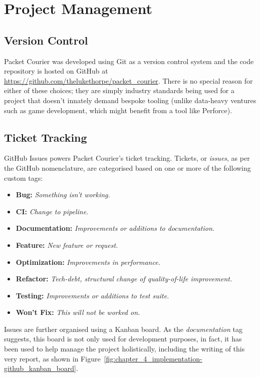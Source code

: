 \section{Project Management}\label{section:project_management}

\subsection{Version Control}\label{subsection:version_control}

Packet Courier was developed using Git\cite{git} as a version control system and the code repository is hosted on
GitHub\cite{github, packet_courier} at \url{https://github.com/thelukethorpe/packet_courier}. There is no special
reason for either of these choices; they are simply industry standards being used for a project that doesn't
innately demand bespoke tooling (unlike data-heavy ventures such as game development, which might benefit from a tool
like Perforce\cite{perforce, perforce_vs_git}).

\subsection{Ticket Tracking}\label{subsection:ticket_tracking}

GitHub Issues\cite{github_issues} powers Packet Courier's ticket tracking. Tickets, or \emph{issues}, as per the
GitHub nomenclature, are categorised based on one or more of the following custom tags:
\begin{itemize}
    \item \textbf{Bug:} \emph{Something isn't working.}
    \item \textbf{CI:} \emph{Change to pipeline.}
    \item \textbf{Documentation:} \emph{Improvements or additions to documentation.}
    \item \textbf{Feature:} \emph{New feature or request.}
    \item \textbf{Optimization:} \emph{Improvements in performance.}
    \item \textbf{Refactor:} \emph{Tech-debt, structural change of quality-of-life improvement.}
    \item \textbf{Testing:} \emph{Improvements or additions to test suite.}
    \item \textbf{Won't Fix:} \emph{This will not be worked on.}
\end{itemize}

Issues are further organised using a Kanban board\cite{kanban_board}. As the \emph{documentation} tag suggests,
this board is not only used for development purposes, in fact, it has been used to help manage the project
holistically, including the writing of this very report, as shown in
Figure~\ref{fig:chapter_4_implementation-github_kanban_board}.

